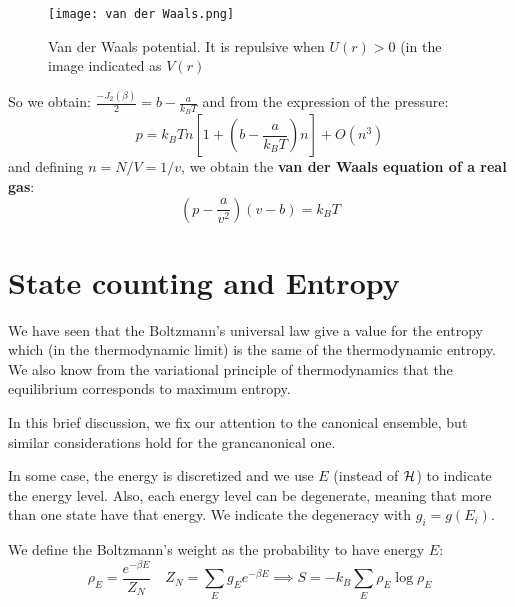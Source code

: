 \begin{figure}[t]
    \centering
    \texttt{[image: van der Waals.png]}
    \caption{Van der Waals potential. It is repulsive when $U(r) > 0$ (in the image indicated as $V(r)$}
    \label{fig:vanDerWaals}
\end{figure}

So we obtain: $ \frac{-J_2(\beta)}2 = b- \frac a{k_BT}$ and from the expression of the pressure:
$$ \boxed{p = k_BTn\left[1 + \left(b- \frac a{k_BT}\right)n\right]} + O(n^3)$$
and defining $n = N/V = 1/v$, we obtain the \textbf{van der Waals equation of a real gas}: 
$$ \boxed{\left(p - \frac a{v^2}\right)\left(v - b\right) = k_BT} $$

\vspace{30pt}


\section{State counting and Entropy}
We have seen that the Boltzmann's universal law give a value for the entropy which (in the thermodynamic limit) is the same of the thermodynamic entropy. We also know from the variational principle of thermodynamics that the equilibrium corresponds to maximum entropy.

In this brief discussion, we fix our attention to the canonical ensemble, but similar considerations hold for the grancanonical one.

In some case, the energy is discretized and we use $E$ (instead of $\mathcal{H}$) to indicate the energy level. Also, each energy level can be degenerate, meaning that more than one state have that energy. We indicate the degeneracy with $g_i = g(E_i)$.

We define the Boltzmann's weight as the probability to have energy $E$:
\begin{equation} \label{eq:boltzmann-weight}
\rho_E = \frac{e^{-\beta E}}{Z_N} \quad Z_N = \sum_E g_E e^{-\beta E} \implies S = -k_B\sum_E \rho_E \log \rho_E    
\end{equation}

